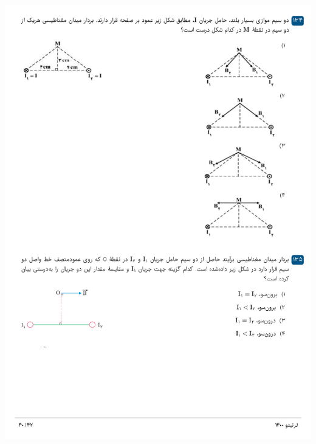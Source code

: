 \documentclass{book}
\begin{document}
\includegraphics[width=\textwidth]{"pages/40"}
\end{document}
